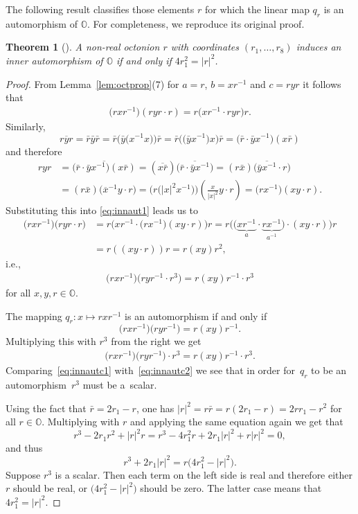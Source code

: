 \documentclass[pdftex]{sigma}
\numberwithin{equation}{section}
\newtheorem{Theorem}{Theorem}[section]
\newcommand{\SO}{\mathbb{O}} %
\begin{document}
The following result classifies those elements $r$ for which the linear map $q_r$ is an automorphism of $\SO$. For completeness, we reproduce its original proof.
\begin{Theorem}[\cite{lamont1963arithmetics}] \label{thm:reoctin}
 A non-real octonion $r$ with coordinates $(r_1,\dots,r_8)$ induces an inner automorphism of $\SO$ if and only if $4r_1^2=|r|^2$.
\end{Theorem}
\begin{proof} From Lemma~\ref{lem:octprop}(7) for $a=r$, $b=xr^{-1}$ and $c=ryr$ it follows that
 \begin{gather} \big(rxr^{-1}\big)(ryr \cdot r)=r\big(xr^{-1} \cdot ryr \big)r. \label{eq:innaut1}\end{gather}
 Similarly,
 \[\overline{ryr}=\bar{r}\bar{y}\bar{r}=\bar{r}\big(\bar{y} \big(x^{-1}x\big)\big)\bar{r}=\bar{r}\big(\big(\bar{y} x^{-1}\big)x\big)\bar{r}=\big(\bar{r} \cdot \bar{y}x^{-1}\big)(x\bar{r})\]
 and therefore
 \begin{align*}
 ryr &= \overline{\big(\bar{r} \cdot \bar{y}x^{-1}\big)(x\bar{r})}=(\overline{x\bar{r}}) \big(\overline{\bar{r}\cdot \bar{y}x^{-1}}\big)=(r\bar{x})\big(\overline{\bar{y}x^{-1}} \cdot r\big) \\
 &=(r\bar{x}) \big(\overline{x}^{-1}y\cdot r\big)= \big(r \big(|x|^2 x^{-1}\big) \big) \left(\frac{x}{|x|^2}y\cdot r\right)=\big(r x^{-1} \big) (xy\cdot r).
 \end{align*}
 Substituting this into \eqref{eq:innaut1} leads us to
 \begin{align*}
 \big(rxr^{-1}\big)\big(ryr \cdot r\big)&=r\big(xr^{-1} \cdot \big(r x^{-1} \big) (xy\cdot r) \big)r =r\big( \big(\underbrace{xr^{-1}}_a \cdot \underbrace{r x^{-1}}_{a^{-1}} \big) \cdot (xy\cdot r) \big)r\\
 &=r((xy\cdot r) )r= r(xy)r^2,
 \end{align*}
 i.e.,
 \begin{gather} \big(rxr^{-1}\big)\big(ryr^{-1} \cdot r^3\big)=r(xy)r^{-1}\cdot r^3 \label{eq:innautc1}\end{gather}
 for all $x,y,r\in\SO$.

 The mapping $q_r\colon x\mapsto rxr^{-1}$ is an automorphism if and only if
 \[ \big(rxr^{-1}\big)\big(ryr^{-1}\big)=r(xy)r^{-1}.\]
 Multiplying this with $r^3$ from the right we get
 \begin{gather} \big(rxr^{-1}\big)\big(ryr^{-1}\big) \cdot r^3=r(xy)r^{-1}\cdot r^3. \label{eq:innautc2}\end{gather}
 Comparing~\eqref{eq:innautc1} with~\eqref{eq:innautc2} we see that in order for~$q_r$ to be an automorphism~$r^{3}$ must be a~scalar.

 Using the fact that $\bar{r}=2r_1-r$, one has $|r|^2=r\bar{r}=r(2r_1-r)=2rr_1-r^2$ for all $r \in \SO$. Multiplying with $r$ and applying the same equation again we get that
 \[ r^3-2r_1r^2+|r|^2r=r^3-4r_1^2 r+2r_1|r|^2+r|r|^2=0, \]
 and thus
 \[ r^3+2r_1|r|^2=r\big(4r_1^2 -|r|^2\big). \]
 Suppose $r^{3}$ is a scalar. Then each term on the left side is real and therefore either $r$ should be real, or $\big(4r_1^2 -|r|^2\big)$ should be zero. The latter case means that $4r_1^2 =|r|^2$.
\end{proof}
\end{document}

